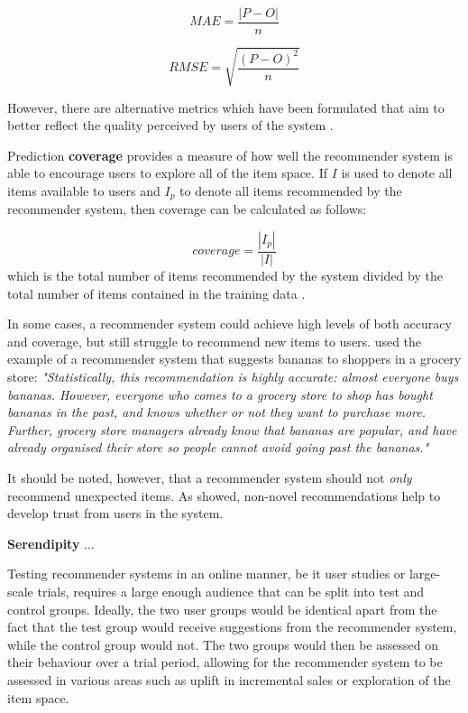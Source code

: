 \begin{equation}
    MAE = \dfrac{|P - O|}{n}
\end{equation}

\begin{equation}
    RMSE = \sqrt{\dfrac{(P - O)^{2}}{n}}
\end{equation}

However, there are alternative metrics which have been formulated that aim to better reflect the quality perceived by users of the system \parencite{eval_colab}.

Prediction \textbf{coverage} provides a measure of how well the recommender system is able to encourage users to explore all of the item space. If $I$ is used to denote all items available to users and $I_p$ to denote all items recommended by the recommender system, then coverage can be calculated as follows:

\begin{equation}
    coverage = \dfrac{|I_p|}{|I|}
\end{equation}
\hspace{2em} which is the total number of items recommended by the system divided by the total number of items contained in the training data \parencite{eval_coverage}.

In some cases, a recommender system could achieve high levels of both accuracy and coverage, but still struggle to recommend new items to users. \cite{eval_colab} used the example of a recommender system that suggests bananas to shoppers in a grocery store: \textit{"Statistically, this recommendation is highly accurate: almost everyone buys bananas. However, everyone who comes to a grocery store to shop has bought bananas in the past, and knows whether or not they want to purchase more. Further, grocery store managers already know that bananas are popular, and have already organised their store so people cannot avoid going past the bananas."} 

It should be noted, however, that a recommender system should not \textit{only} recommend unexpected items. As \cite{swearingen2001beyondalgorithms} showed, non-novel recommendations help to develop trust from users in the system.

\textbf{Serendipity} ...

Testing recommender systems in an online manner, be it user studies or large-scale trials, requires a large enough audience that can be split into test and control groups. Ideally, the two user groups would be identical apart from the fact that the test group would receive suggestions from the recommender system, while the control group would not. The two groups would then be assessed on their behaviour over a trial period, allowing for the recommender system to be assessed in various areas such as uplift in incremental sales or exploration of the item space. \parencite{online_predicting}

